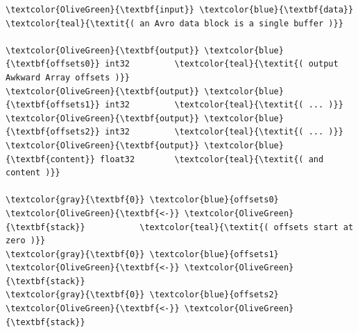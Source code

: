 \documentclass{webofc}
\begin{document}
\begin{Verbatim}[commandchars=\\\{\}]
\textcolor{OliveGreen}{\textbf{input}} \textcolor{blue}{\textbf{data}}                    \textcolor{teal}{\textit{( an Avro data block is a single buffer )}}

\textcolor{OliveGreen}{\textbf{output}} \textcolor{blue}{\textbf{offsets0}} int32         \textcolor{teal}{\textit{( output Awkward Array offsets )}}
\textcolor{OliveGreen}{\textbf{output}} \textcolor{blue}{\textbf{offsets1}} int32         \textcolor{teal}{\textit{( ... )}}
\textcolor{OliveGreen}{\textbf{output}} \textcolor{blue}{\textbf{offsets2}} int32         \textcolor{teal}{\textit{( ... )}}
\textcolor{OliveGreen}{\textbf{output}} \textcolor{blue}{\textbf{content}} float32        \textcolor{teal}{\textit{( and content )}}

\textcolor{gray}{\textbf{0}} \textcolor{blue}{offsets0} \textcolor{OliveGreen}{\textbf{<-}} \textcolor{OliveGreen}{\textbf{stack}}           \textcolor{teal}{\textit{( offsets start at zero )}}
\textcolor{gray}{\textbf{0}} \textcolor{blue}{offsets1} \textcolor{OliveGreen}{\textbf{<-}} \textcolor{OliveGreen}{\textbf{stack}}
\textcolor{gray}{\textbf{0}} \textcolor{blue}{offsets2} \textcolor{OliveGreen}{\textbf{<-}} \textcolor{OliveGreen}{\textbf{stack}}


\end{Verbatim}
\end{document}

